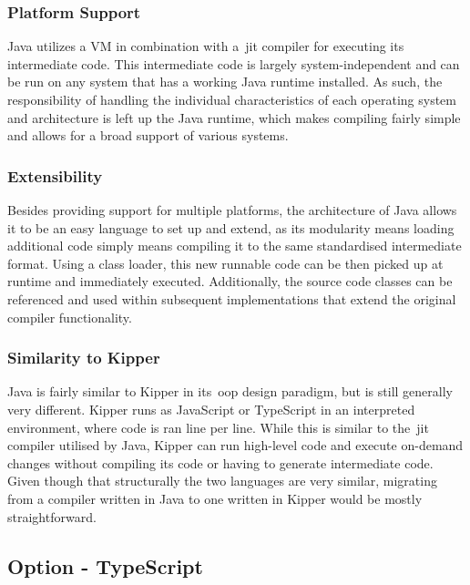 \subsubsection{Platform Support}

Java utilizes a VM in combination with a~\acrshort{jit} compiler for executing its intermediate code. This intermediate code is largely system-independent and can be run on any system that has a working Java runtime installed. As such, the responsibility of handling the individual characteristics of each operating system and architecture is left up the Java runtime, which makes compiling fairly simple and allows for a broad support of various systems.

\subsubsection{Extensibility}

Besides providing support for multiple platforms, the architecture of Java allows it to be an easy language to set up and extend, as its modularity means loading additional code simply means compiling it to the same standardised intermediate format. Using a class loader, this new runnable code can be then picked up at runtime and immediately executed. Additionally, the source code classes can be referenced and used within subsequent implementations that extend the original compiler functionality.

\subsubsection{Similarity to Kipper}

Java is fairly similar to Kipper in its~\acrshort{oop} design paradigm, but is still generally very different. Kipper runs as JavaScript or TypeScript in an interpreted environment, where code is ran line per line. While this is similar to the~\acrshort{jit} compiler utilised by Java, Kipper can run high-level code and execute on-demand changes without compiling its code or having to generate intermediate code. Given though that structurally the two languages are very similar, migrating from a compiler written in Java to one written in Kipper would be mostly straightforward.

\subsection{Option - TypeScript}
\label{sec:programming-language-option-typescript}

